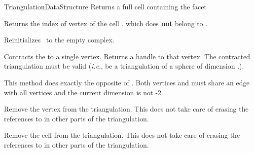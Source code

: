 \begin{ccRefConcept}{TriangulationDataStructure}
{Returns a full cell containing the facet }

{Returns the index of vertex of the cell \ccVar.
which does \textbf{not} belong to .}


%
%


{Reinitializes \ccVar\ to the empty complex.}

 {Contracts the
 to a single vertex. Returns a handle to that vertex. \ccPrecond
The contracted triangulation must be valid (\emph{i.e.}, be a triangulation of
a sphere of dimension \ccVar.).}

 {This method does exactly the opposite of
. \ccPrecond Both vertices  and
 must share an edge with all vertices and the current
dimension is not -2.}

\begin{ccAdvanced}

{Remove the vertex  from the triangulation. This does not take care of
erasing the references to  in other parts of the triangulation.}

{Remove the cell  from the triangulation. This does not take care of
erasing the references to  in other parts of the triangulation.}


\end{ccAdvanced}
\end{ccRefConcept}
